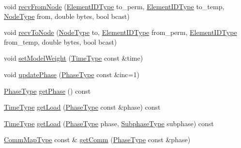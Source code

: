 \begin{DoxyCompactItemize}
\item 
void \hyperlink{structvt_1_1vrt_1_1collection_1_1balance_1_1_element_stats_af251d52d4d0be99a7745295148abcb4e}{recv\+From\+Node} (\hyperlink{namespacevt_1_1vrt_1_1collection_1_1balance_a14c8d2c972f2913aa3f1636e5be0a120}{Element\+I\+D\+Type} to\+\_\+perm, \hyperlink{namespacevt_1_1vrt_1_1collection_1_1balance_a14c8d2c972f2913aa3f1636e5be0a120}{Element\+I\+D\+Type} to\+\_\+temp, \hyperlink{namespacevt_a866da9d0efc19c0a1ce79e9e492f47e2}{Node\+Type} from, double bytes, bool bcast)
\item 
void \hyperlink{structvt_1_1vrt_1_1collection_1_1balance_1_1_element_stats_aa7eb11ba5b2787b129925d9f2cd0ac89}{recv\+To\+Node} (\hyperlink{namespacevt_a866da9d0efc19c0a1ce79e9e492f47e2}{Node\+Type} to, \hyperlink{namespacevt_1_1vrt_1_1collection_1_1balance_a14c8d2c972f2913aa3f1636e5be0a120}{Element\+I\+D\+Type} from\+\_\+perm, \hyperlink{namespacevt_1_1vrt_1_1collection_1_1balance_a14c8d2c972f2913aa3f1636e5be0a120}{Element\+I\+D\+Type} from\+\_\+temp, double bytes, bool bcast)
\item 
void \hyperlink{structvt_1_1vrt_1_1collection_1_1balance_1_1_element_stats_aebacf2dd9e43b4886956741be1647d84}{set\+Model\+Weight} (\hyperlink{namespacevt_a876a9d0cd5a952859c72de8a46881442}{Time\+Type} const \&time)
\item 
void \hyperlink{structvt_1_1vrt_1_1collection_1_1balance_1_1_element_stats_a6ba8726a871702870d76dca6de298d07}{update\+Phase} (\hyperlink{namespacevt_a46ce6733d5cdbd735d561b7b4029f6d7}{Phase\+Type} const \&inc=1)
\item 
\hyperlink{namespacevt_a46ce6733d5cdbd735d561b7b4029f6d7}{Phase\+Type} \hyperlink{structvt_1_1vrt_1_1collection_1_1balance_1_1_element_stats_a24fcc0af9fb6017b556828a52431bc1c}{get\+Phase} () const
\item 
\hyperlink{namespacevt_a876a9d0cd5a952859c72de8a46881442}{Time\+Type} \hyperlink{structvt_1_1vrt_1_1collection_1_1balance_1_1_element_stats_aeb819ff1258eda6a7a1ccbd51b256731}{get\+Load} (\hyperlink{namespacevt_a46ce6733d5cdbd735d561b7b4029f6d7}{Phase\+Type} const \&phase) const
\item 
\hyperlink{namespacevt_a876a9d0cd5a952859c72de8a46881442}{Time\+Type} \hyperlink{structvt_1_1vrt_1_1collection_1_1balance_1_1_element_stats_a04ffe937cfa084fb7bb52820312ec9c2}{get\+Load} (\hyperlink{namespacevt_a46ce6733d5cdbd735d561b7b4029f6d7}{Phase\+Type} phase, \hyperlink{namespacevt_ae78cbfdf1e57470e33eedb074f2beeba}{Subphase\+Type} subphase) const
\item 
\hyperlink{namespacevt_1_1vrt_1_1collection_1_1balance_a10860c956804d644db54a16012352728}{Comm\+Map\+Type} const  \& \hyperlink{structvt_1_1vrt_1_1collection_1_1balance_1_1_element_stats_a917ec0f6f274acc254c24c01fa66afa6}{get\+Comm} (\hyperlink{namespacevt_a46ce6733d5cdbd735d561b7b4029f6d7}{Phase\+Type} const \&phase)

\end{DoxyCompactItemize}
